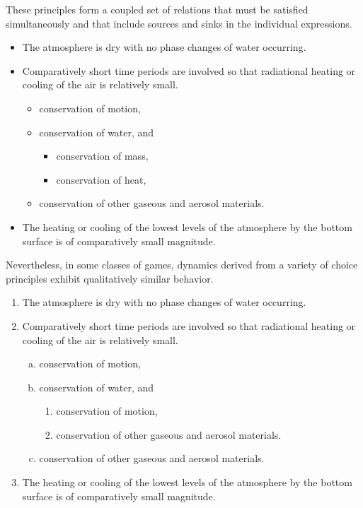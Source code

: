 \documentclass[onecolumn,authoryear]{els-mrw}
\begin{document}
These principles form a coupled set of relations that must be
satisfied simultaneously and that include sources and sinks in the
individual expressions.
\begin{itemize}%
\item The atmosphere is dry with no phase changes of water occurring.
\item Comparatively short time periods are involved so that radiational
heating or cooling of the air is relatively small.
\begin{itemize}%
\item conservation of motion,
\item conservation of water, and
\begin{itemize}%
\item conservation of mass,
\item conservation of heat,
\end{itemize}
\item conservation of other gaseous and aerosol materials.
\end{itemize}
\item The heating or cooling of the lowest levels of the atmosphere by
the bottom surface is of comparatively small magnitude.
\end{itemize}%
Nevertheless, in some classes of games, dynamics derived from a variety of choice principles exhibit qualitatively similar behavior.
\begin{enumerate}%
\item The atmosphere is dry with no phase changes of water occurring.
\item Comparatively short time periods are involved so that radiational
heating or cooling of the air is relatively small.
\begin{enumerate}[a.]%
\item conservation of motion,
\item conservation of water, and
\begin{enumerate}%
\item conservation of motion,
\item conservation of other gaseous and aerosol materials.
\end{enumerate}
\item conservation of other gaseous and aerosol materials.
\end{enumerate}
\item The heating or cooling of the lowest levels of the atmosphere by
the bottom surface is of comparatively small magnitude.
\end{enumerate}%
\end{document}

